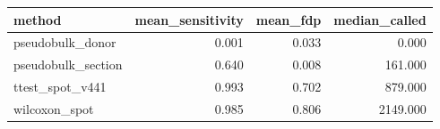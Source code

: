 \begin{tabular}{lrrr}
\toprule
method & mean_sensitivity & mean_fdp & median_called \\
\midrule
pseudobulk_donor & 0.001 & 0.033 & 0.000 \\
pseudobulk_section & 0.640 & 0.008 & 161.000 \\
ttest_spot_v441 & 0.993 & 0.702 & 879.000 \\
wilcoxon_spot & 0.985 & 0.806 & 2149.000 \\
\bottomrule
\end{tabular}
